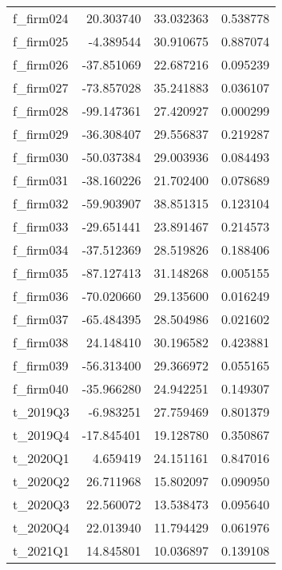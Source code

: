 \begin{table}
\begin{tabular}{lrrr}
f\_firm024 &  20.303740 & 33.032363 & 0.538778 \\
f\_firm025 &  -4.389544 & 30.910675 & 0.887074 \\
f\_firm026 & -37.851069 & 22.687216 & 0.095239 \\
f\_firm027 & -73.857028 & 35.241883 & 0.036107 \\
f\_firm028 & -99.147361 & 27.420927 & 0.000299 \\
f\_firm029 & -36.308407 & 29.556837 & 0.219287 \\
f\_firm030 & -50.037384 & 29.003936 & 0.084493 \\
f\_firm031 & -38.160226 & 21.702400 & 0.078689 \\
f\_firm032 & -59.903907 & 38.851315 & 0.123104 \\
f\_firm033 & -29.651441 & 23.891467 & 0.214573 \\
f\_firm034 & -37.512369 & 28.519826 & 0.188406 \\
f\_firm035 & -87.127413 & 31.148268 & 0.005155 \\
f\_firm036 & -70.020660 & 29.135600 & 0.016249 \\
f\_firm037 & -65.484395 & 28.504986 & 0.021602 \\
f\_firm038 &  24.148410 & 30.196582 & 0.423881 \\
f\_firm039 & -56.313400 & 29.366972 & 0.055165 \\
f\_firm040 & -35.966280 & 24.942251 & 0.149307 \\
 t\_2019Q3 &  -6.983251 & 27.759469 & 0.801379 \\
 t\_2019Q4 & -17.845401 & 19.128780 & 0.350867 \\
 t\_2020Q1 &   4.659419 & 24.151161 & 0.847016 \\
 t\_2020Q2 &  26.711968 & 15.802097 & 0.090950 \\
 t\_2020Q3 &  22.560072 & 13.538473 & 0.095640 \\
 t\_2020Q4 &  22.013940 & 11.794429 & 0.061976 \\
 t\_2021Q1 &  14.845801 & 10.036897 & 0.139108 \\
\bottomrule
\end{tabular}
\end{table}
